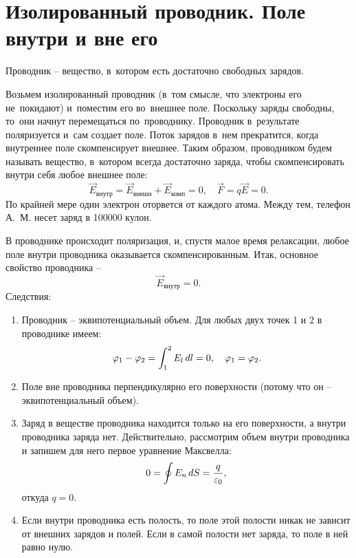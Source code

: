 \section{Изолированный проводник. Поле внутри и вне его}
	
	Проводник -- вещество, в~котором есть достаточно свободных зарядов. \par
	Возьмем изолированный проводник (в~том смысле, что электроны его не~покидают) и~поместим его во~внешнее поле. Поскольку заряды свободны, то~они начнут перемещаться по~проводнику. Проводник в~результате поляризуется и~сам создает поле. Поток зарядов в~нем прекратится, когда внутреннее поле скомпенсирует внешнее. Таким образом, проводником будем называть вещество, в~котором всегда достаточно заряда, чтобы скомпенсировать внутри себя любое внешнее поле:
		$$\vec{E}_{\text{внутр}}=\vec{E}_{\text{внешн}}+\vec{E}_{\text{комп}}=0, \quad \vec{F}=q\vec{E}=0.$$
	По крайней мере один электрон оторвется от каждого атома. Между тем, телефон А.~М. несет заряд в 100000 кулон. \par
	В проводнике происходит поляризация, и, спустя малое время релаксации, любое поле внутри проводника оказывается скомпенсированным. Итак, основное свойство проводника --
		\begin{equation}
			\vec{E}_{\text{внутр}}=0.
		\end{equation}
	Следствия:
		\begin{enumerate}
			\item Проводник -- эквипотенциальный объем. Для любых двух точек 1 и 2 в проводнике имеем:
					$$\varphi_1-\varphi_2=\int_1^2 E_l\,d l=0, \quad \varphi_1=\varphi_2.$$
			\item Поле вне проводника перпендикулярно его поверхности (потому что он -- эквипотенциальный объем).
			\item Заряд в веществе проводника находится только на его поверхности, а внутри проводника заряда нет. Действительно, рассмотрим объем внутри проводника и запишем для него первое уравнение Максвелла:
				$$0=\oint E_n\,d S=\frac{q}{\varepsilon_0},$$
			откуда $q=0$.
			\item Если внутри проводника есть полость, то поле этой полости никак не зависит от внешних зарядов и полей. Если в самой полости нет заряда, то поле в ней равно нулю.
		\end{enumerate}
